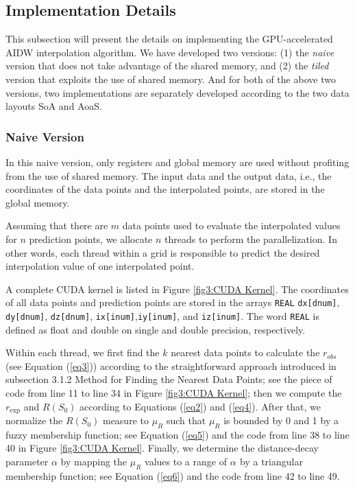 \documentclass[fleqn,11pt]{wlscirep}
\begin{document}
\subsection{Implementation Details}

This subsection will present the details on implementing the GPU-accelerated 
AIDW interpolation algorithm. We have developed two versions: (1) the 
\textit{naive} version that does not take advantage of the shared memory, and (2) the 
\textit{tiled} version that exploits the use of shared memory. And for both of the above 
two versions, two implementations are separately developed according to the 
two data layouts SoA and AoaS.

\subsubsection{Naive Version}

In this naive version, only registers and global memory are used without 
profiting from the use of shared memory. The input data and the output data, 
i.e., the coordinates of the data points and the interpolated points, are 
stored in the global memory. 

Assuming that there are $m$ data points used to evaluate the interpolated 
values for $n$ prediction points, we allocate $n$ threads to perform the 
parallelization. In other words, each thread within a grid is responsible to 
predict the desired interpolation value of one interpolated point.

A complete CUDA kernel is listed in Figure \ref{fig3:CUDA Kernel}. The coordinates of all data 
points and prediction points are stored in the arrays \texttt{REAL} 
\texttt{dx[dnum]}, \texttt{dy[dnum]}, \texttt{dz[dnum]}, \texttt{ix[inum]},\texttt{iy[inum]}, and \texttt{iz[inum]}. The word \texttt{REAL} is 
defined as float and double on single and double precision, respectively.

Within each thread, we first find the $k$ nearest data points to calculate the 
$r_{obs} $ (see Equation (\ref{eq3})) according to the straightforward approach 
introduced in subsection 3.1.2 Method for Finding the Nearest Data 
Points; see the piece of code from line 11 to line 34 in Figure \ref{fig3:CUDA Kernel}; 
then we compute the $r_{\exp } $ and $R\left( {S_0 } \right)$ according to 
Equations (\ref{eq2}) and (\ref{eq4}). After that, we normalize the $R\left( {S_0 } 
\right)$ measure to $\mu _R $ such that $\mu _R $ is bounded by 0 and 1 by a 
fuzzy membership function; see Equation (\ref{eq5}) and the code from line 38 to 
line 40 in Figure \ref{fig3:CUDA Kernel}. Finally, we determine the distance-decay parameter 
$\alpha $ by mapping the $\mu _{R}$ values to a range of $\alpha _{ }$ by 
a triangular membership function; see Equation (\ref{eq6}) and the code from line 42 
to line 49.
\end{document}
